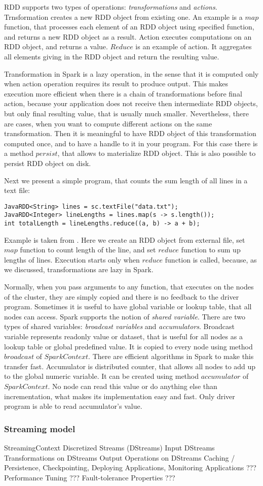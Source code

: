 RDD supports two types of operations: \textit{transformations}  and \textit{actions}.
Trnsformation creates a new RDD object from existing one.
An example is a $map$ function, that processes each element of an RDD object using specified function, and returns a new RDD object as a result.
Action executes computations on an RDD object, and returns a value.
$Reduce$ is an example of action.
It aggregates all elements giving in the RDD object and return the resulting value.

Transformation in Spark is a lazy operation, in the sense that it is computed only when action operation requires its result to produce output.
This makes execution more efficient when there is a chain of transformations before final action, because your application does not receive then intermediate RDD objects, but only final resulting value, that is usually much smaller.
Nevertheless, there are cases, when you want to compute different actions on the same transformation.
Then it is meaningful to have RDD object of this transformation computed once, and to have a handle to it in your program.
For this case there is a method $persist$, that allows to materialize RDD object.
This is also possible to persist RDD object on disk.

Next we present a simple program, that counts the sum length of all lines in a text file:
\begin{verbatim}
JavaRDD<String> lines = sc.textFile("data.txt");
JavaRDD<Integer> lineLengths = lines.map(s -> s.length());
int totalLength = lineLengths.reduce((a, b) -> a + b);
\end{verbatim}
Example is taken from \cite{Spark1}.
Here we create an RDD object from external file, set $map$ function to count length of the line, and set $reduce$ function to sum up lengths of lines.
Execution starts only when $reduce$ function is called, because, as we discussed, transformations are lazy in Spark.

Normally, when you pass arguments to any function, that executes on the nodes of the cluster, they are simply copied and there is no feedback to the driver program.
Sometimes it is useful to have global variable or lookup table, that all nodes can access.
Spark supports the notion of \textit{shared variable}.
There are two types of shared variables: \textit{broadcast variables}  and \textit{accumulators}.
Broadcast variable represents readonly value or dataset, that is useful for all nodes as a lookup table or global predefined value.
It is copied to every node using method $broadcast$ of $SparkContext$.
There are efficient algorithms in Spark to make this transfer fast.
Accumulator is distributed counter, that allows all nodes to add up to the global numeric variable.
It can be created using method $accumulator$ of $SparkContext$.
No node can read this value or do anything else than incrementation, what makes its implementation easy and fast.
Only driver program is able to read accumulator's value.

\subsubsection{Streaming model}

StreamingContext
Discretized Streams (DStreams)
Input DStreams
Transformations on DStreams
Output Operations on DStreams
Caching / Persistence, Checkpointing, Deploying Applications, Monitoring Applications ???
Performance Tuning ???
Fault-tolerance Properties ???